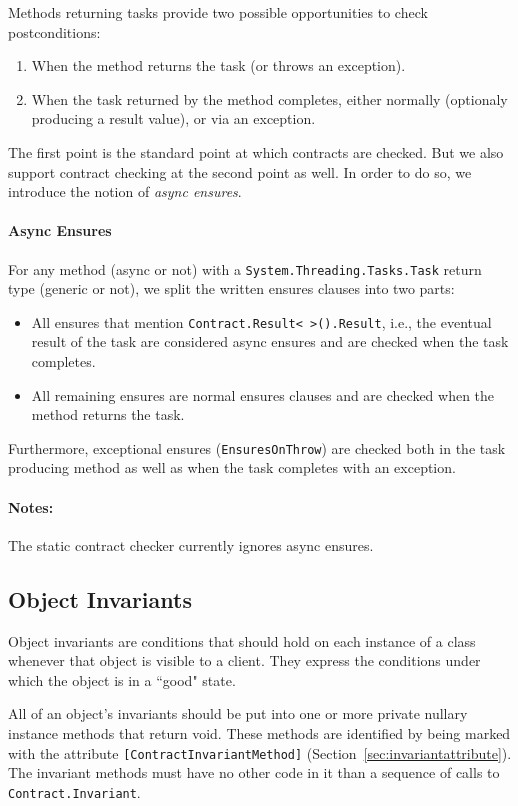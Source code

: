 \documentclass{article}
\newcommand{\code}[1]{\lstinline{#1}}
\begin{document}
Methods returning tasks provide two possible opportunities
to check postconditions:
\begin{enumerate}
\item When the method returns the task (or throws an exception).
\item When the task returned by the method completes, either normally (optionaly producing a
  result value), or via an exception.
\end{enumerate}
The first point is the standard point at which contracts are
checked. But we also support contract checking at the second point as
well. In order to do so, we introduce the notion of \emph{async
  ensures}.

\paragraph{Async Ensures} For any method (async or not) with a
\code{System.Threading.Tasks.Task} return type (generic or not), we
split the written ensures clauses into two parts:
\begin{itemize}
\item All ensures that mention \code{Contract.Result< >().Result}, i.e.,
  the eventual result of the task are considered async ensures and are
  checked when the task completes.
\item All remaining ensures are normal ensures clauses and are checked
  when the method returns the task.
\end{itemize}
Furthermore, exceptional ensures (\code{EnsuresOnThrow}) are 
checked both in the task producing method as well as when the task
completes with an exception.

\paragraph{Notes:} The static contract checker currently ignores async
ensures.

\subsection{Object Invariants}
\label{sec:invariants}
Object invariants are conditions that should hold on each instance of
a class whenever that object is visible to a client. They express the
conditions under which the object is in a ``good" state.  

All of an object's invariants should be put into one or more private
nullary instance methods that return void.  These methods are identified
by being marked with the attribute \code{[ContractInvariantMethod]}
(Section~\ref{sec:invariantattribute}). The invariant methods must have
no other code in it than a sequence of calls to
\code{Contract.Invariant}. 
\end{document}
